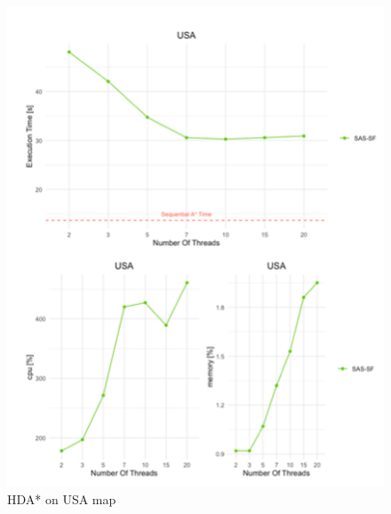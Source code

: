 \documentclass[twocolumn, switch]{article} %
\begin{document}
\begin{figure}[ht!]
  \centering
  \includegraphics[width=1\linewidth]{hda/usa.png}
  \caption{HDA* on USA map}
  \label{hdausa}
\end{figure}
\end{document}
